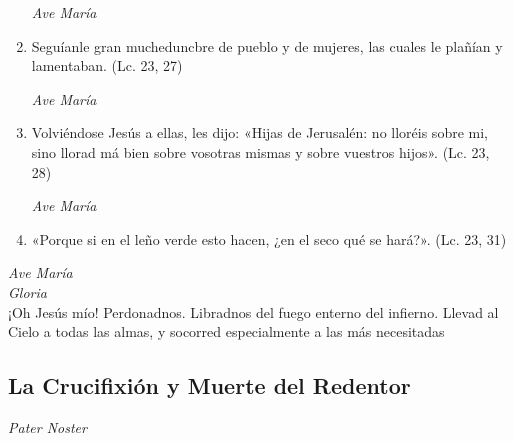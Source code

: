 \documentclass[a4paper,11pt, oneside]{report}
\begin{document}
\begin{enumerate}
        \textit{Ave María}

        \item Seguíanle gran mucheduncbre de pueblo y de mujeres, las cuales le plañían y lamentaban. (Lc. 23, 27)

        \textit{Ave María}

        \item Volviéndose Jesús a ellas, les dijo: «Hijas de Jerusalén: no lloréis sobre mi, sino llorad má bien sobre vosotras mismas y sobre
        vuestros hijos». (Lc. 23, 28)

        \textit{Ave María}

        \item «Porque si en el leño verde esto hacen, ¿en el seco qué se hará?». (Lc. 23, 31)

      \end{enumerate}

      \textit{Ave María} \\
      \indent\textit{Gloria} \\
      \indent¡Oh Jesús mío! Perdonadnos. Libradnos del fuego enterno del infierno. Llevad al Cielo a todas las almas, y socorred especialmente a las más 
      necesitadas

    \subsection*{ La Crucifixión y Muerte del Redentor }
      
      \textit{Pater Noster}
\end{document}
